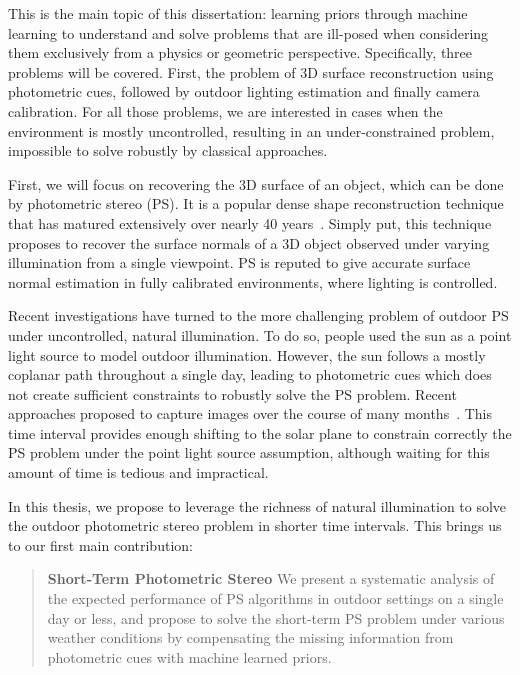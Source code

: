 This is the main topic of this dissertation: learning priors through machine learning to understand and solve problems that are ill-posed when considering them exclusively from a physics or geometric perspective. Specifically, three problems will be covered. First, the problem of 3D surface reconstruction using photometric cues, followed by outdoor lighting estimation and finally camera calibration. For all those problems, we are interested in cases when the environment is mostly uncontrolled, resulting in an under-constrained problem, impossible to solve robustly by classical approaches. 

First, we will focus on recovering the 3D surface of an object, which can be done by photometric stereo (PS). It is a popular dense shape reconstruction technique that has matured extensively over nearly 40 years~\cite{woodham-opteng-80}. %
Simply put, this technique proposes to recover the surface normals of a 3D object observed under varying illumination from a single viewpoint. 
PS is reputed to give accurate surface normal estimation in fully calibrated environments, where lighting is controlled. 

Recent investigations have turned to the more challenging problem of outdoor PS under uncontrolled, natural illumination. To do so, people used the sun as a point light source to model outdoor illumination. However, the sun follows a mostly coplanar path throughout a single day, leading to photometric cues which does not create sufficient constraints to robustly solve the PS problem. Recent approaches proposed to capture images over the course of many months~\cite{ackermann-cvpr-12,abrams-eccv-12}. This time interval provides enough shifting to the solar plane to constrain correctly the PS problem under the point light source assumption, although waiting for this amount of time is tedious and impractical. 

In this thesis, we propose to leverage the richness of natural illumination to solve the outdoor photometric stereo problem in shorter time intervals. This brings us to our first main contribution: 

\begin{quotation}
\textbf{Short-Term Photometric Stereo} We present a systematic analysis of the expected performance of PS algorithms in outdoor settings on a single day or less, and propose to solve the short-term PS problem under various weather conditions by compensating the missing information from photometric cues with machine learned priors. 
\end{quotation}

